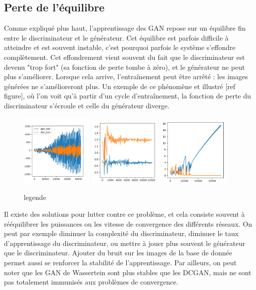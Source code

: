 \subsection{Perte de l'équilibre}

Comme expliqué plus haut, l'apprentissage des GAN repose sur un équilibre fin entre le discriminateur et le générateur. Cet équilibre est parfois difficile à atteindre et est souvent instable, c'est pourquoi parfois le système s'effondre complètement. Cet effondrement vient souvent du fait que le discriminateur est devenu "trop fort" (sa fonction de perte tombe à zéro), et le générateur ne peut plus s'améliorer. Lorsque cela arrive, l’entraînement peut être arrêté : les images générées ne s'amélioreront plus. Un exemple de ce phénomène et illustré [ref figure], où l'on voit qu'à partir d'un cycle d’entraînement, la fonction de perte du discriminateur s'écroule et celle du générateur diverge.

\begin{figure}[!h]
\centering
\includegraphics[width=100pt]{"images/failure1"}
\includegraphics[width=100pt]{"images/failure2"}
\includegraphics[width=100pt]{"images/failure3"}
\caption{legende}
\end{figure}


Il existe des solutions pour lutter contre ce problème, et cela consiste souvent à rééquilibrer les puissances ou les vitesse de convergence des différents réseaux. On peut par exemple diminuer la complexité du discriminateur, diminuer le taux d'apprentissage du discriminateur, ou mettre à jouer plus souvent le générateur que le discriminateur.
Ajouter du bruit sur les images de la base de donnée permet aussi se renforcer la stabilité de l'apprentissage. Par ailleurs, on peut noter que les GAN de Wassertein sont plus stables que les DCGAN, mais ne sont pas totalement immunisés aux problèmes de convergence.
